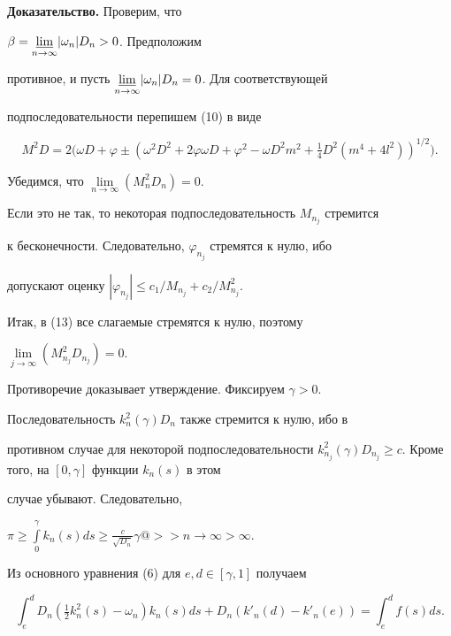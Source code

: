 {\bf Доказательство.} Проверим, что


$\beta=\underset{n\to \infty}{\varliminf}|\omega_n|D_n >0$. Предположим


противное, и пусть $\underset{n\to \infty}{\varliminf}


|{\omega_n}|D_n=0$. Для соответствующей


подпоследовательности перепишем (10) в виде


\begin{equation}


M^2 D=2 \Big(\omega D+\varphi\pm


(\omega^2 D^2 +2\varphi \omega D+\varphi^2-


\omega D^2 m^2 +\tfrac{1}{4}  D^2(m^4+4l^2))^{1/2}\Big).


\end{equation}


Убедимся, что $\lim\limits_{n\to \infty}(M_n^2D_n)=0$.


Если это не так, то некоторая подпоследовательность $M_{n_j}$ стремится


к бесконечности. Следовательно, $\varphi_{n_j}$ стремятся к нулю, ибо


допускают оценку $|{\varphi_{n_j}}|\le c_1/M_{n_j}+c_2/M_{n_j}^2$.


Итак, в (13) все слагаемые стремятся к нулю, поэтому


$\lim\limits_{j \to \infty}(M_{n_j}^2 D_{n_j})=0$.


Противоречие доказывает утверждение. Фиксируем $\gamma >0$.


Последовательность $k_n^2(\gamma) D_n$ также стремится к нулю, ибо в


противном случае для некоторой подпоследовательности $k_{n_j}^2(\gamma)


D_{n_j} \ge c$. Кроме того, на $[0, \gamma ]$ функции $k_n(s)$ в этом


случае убывают. Следовательно,


$\pi \ge \int\limits_0^\gamma {}k_n(s)ds\ge \frac{c}{\sqrt {D_n}}\gamma


@>>{n\to \infty}>\infty$.


Из основного уравнения (6) для $e,d \in [\gamma ,1]$ получаем


$$


\int_e^d {}D_n (\tfrac{1}{2}k_n^2(s)- \omega_n) k_n(s)ds


+ D_n ({{k'_n}(d)-{k'_n}(e)})=\int_e^d {}f(s)ds.


$$


